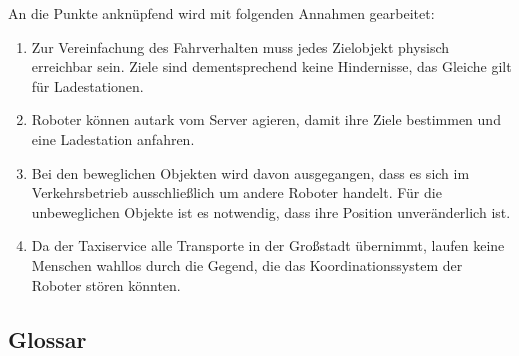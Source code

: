 An die Punkte anknüpfend wird mit folgenden Annahmen gearbeitet:\\
\begin{enumerate}
	\item Zur Vereinfachung des Fahrverhalten muss jedes Zielobjekt physisch erreichbar sein. Ziele sind dementsprechend keine Hindernisse, das Gleiche gilt für Ladestationen.
	\item Roboter können autark vom Server agieren, damit ihre Ziele bestimmen und eine Ladestation anfahren.
	\item Bei den beweglichen Objekten wird davon ausgegangen, dass es sich im Verkehrsbetrieb ausschließlich um andere Roboter handelt. 
	Für die unbeweglichen Objekte ist es notwendig, dass ihre Position unveränderlich ist.
	\item Da der Taxiservice alle Transporte in der Großstadt übernimmt, laufen keine Menschen wahllos durch die Gegend, die das Koordinationssystem der Roboter stören könnten.
\end{enumerate}


		\subsection{Glossar}


		
		
		
